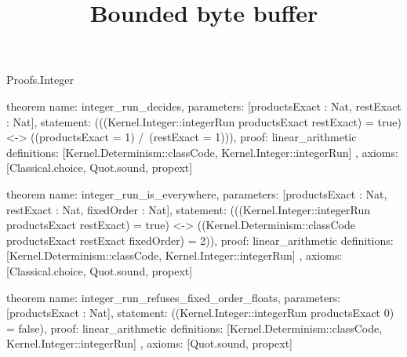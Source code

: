 \begin{lexlean}{Proofs.Integer}
\title{Bounded byte buffer}
\begin{semanticmodule}
theorem{
  name: integer_run_decides,
  parameters: [productsExact : Nat, restExact : Nat],
  statement: (((Kernel.Integer::integerRun productsExact restExact) = true) <-> ((productsExact = 1) /\ (restExact = 1))),
  proof: linear_arithmetic{
    definitions: [Kernel.Determinism::classCode, Kernel.Integer::integerRun]
  },
  axioms: [Classical.choice, Quot.sound, propext]
}

theorem{
  name: integer_run_is_everywhere,
  parameters: [productsExact : Nat, restExact : Nat, fixedOrder : Nat],
  statement: (((Kernel.Integer::integerRun productsExact restExact) = true) <-> ((Kernel.Determinism::classCode productsExact restExact fixedOrder) = 2)),
  proof: linear_arithmetic{
    definitions: [Kernel.Determinism::classCode, Kernel.Integer::integerRun]
  },
  axioms: [Classical.choice, Quot.sound, propext]
}

theorem{
  name: integer_run_refuses_fixed_order_floats,
  parameters: [productsExact : Nat],
  statement: ((Kernel.Integer::integerRun productsExact 0) = false),
  proof: linear_arithmetic{
    definitions: [Kernel.Determinism::classCode, Kernel.Integer::integerRun]
  },
  axioms: [Quot.sound, propext]
}
\end{semanticmodule}
\end{lexlean}
